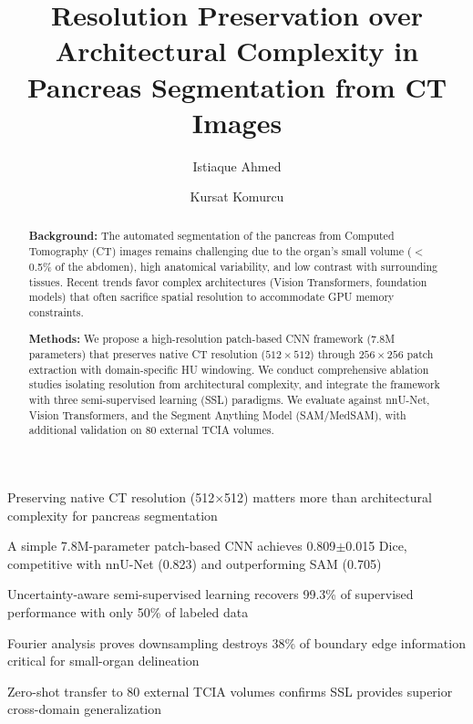 \documentclass[review,authoryear]{elsarticle}
\begin{document}
\begin{frontmatter}

\title{Resolution Preservation over Architectural Complexity in Pancreas Segmentation from CT Images}

\author[vu]{Istiaque Ahmed}
\author[vu]{Kursat Komurcu}


\begin{highlights}
\item Preserving native CT resolution (512$\times$512) matters more than architectural complexity for pancreas segmentation
\item A simple 7.8M-parameter patch-based CNN achieves 0.809$\pm$0.015 Dice, competitive with nnU-Net (0.823) and outperforming SAM (0.705)
\item Uncertainty-aware semi-supervised learning recovers 99.3\% of supervised performance with only 50\% of labeled data
\item Fourier analysis proves downsampling destroys 38\% of boundary edge information critical for small-organ delineation
\item Zero-shot transfer to 80 external TCIA volumes confirms SSL provides superior cross-domain generalization
\end{highlights}

\begin{abstract}
\textbf{Background:} The automated segmentation of the pancreas from Computed Tomography (CT) images remains challenging due to the organ's small volume ($<$0.5\% of the abdomen), high anatomical variability, and low contrast with surrounding tissues. Recent trends favor complex architectures (Vision Transformers, foundation models) that often sacrifice spatial resolution to accommodate GPU memory constraints.

\textbf{Methods:} We propose a high-resolution patch-based CNN framework (7.8M parameters) that preserves native CT resolution ($512 \times 512$) through $256 \times 256$ patch extraction with domain-specific HU windowing. We conduct comprehensive ablation studies isolating resolution from architectural complexity, and integrate the framework with three semi-supervised learning (SSL) paradigms. We evaluate against nnU-Net, Vision Transformers, and the Segment Anything Model (SAM/MedSAM), with additional validation on 80 external TCIA volumes.


\end{abstract}
\end{frontmatter}
\end{document}
